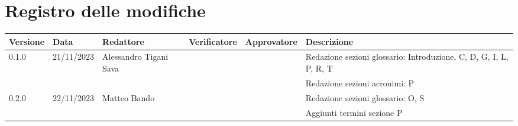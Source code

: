 \section*{Registro delle modifiche}
\begin{scriptsize}
	\begin{tabularx}{\textwidth}{lllllX}
		\textbf{Versione} & \textbf{Data} & \textbf{Redattore}     & \textbf{Verificatore} & \textbf{Approvatore} & \textbf{Descrizione}                                              \\
		\hline
		0.1.0             & 21/11/2023    & Alessandro Tigani Sava &                       &                      & Redazione sezioni glossario: Introduzione, C, D, G, I, L, P, R, T \\
		                  &               &                        &                       &                      & Redazione sezioni acronimi: P                                     \\
		0.2.0             & 22/11/2023    & Matteo Bando           &                       &                      & Redazione sezioni glossario: O, S                                 \\
		                  &               &                        &                       &                      & Aggiunti termini sezione P                                        \\
		\hline
	\end{tabularx}
\end{scriptsize}
